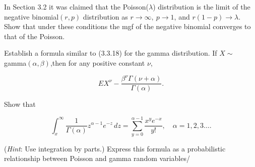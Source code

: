 \documentclass[12pt,letterpaper]{exam}
\begin{document}
\begin{questions}
	
	\begin{solution}
		
	\end{solution}
	
	\question 
	In Section 3.2 it was claimed that the Poisson(\(\lambda\)) distribution is the limit of the negative
	binomial\((r, p)\) distribution as \(r \rightarrow \infty,\ p \rightarrow 1\), and \(r(1-p) \rightarrow \lambda\).
	Show that under these
	conditions the mgf of the negative binomial converges to that of the Poisson.
	
	\begin{solution}
		
	\end{solution}
	
	\setcounter{question}{16}
	\question 
	Establish a formula similar to (3.3.18) for the gamma distribution. 
	If \(X \sim\) gamma\((\alpha,\beta)\),then for any positive constant \(\nu\),
	
	\[EX^\nu - \frac{\beta^\nu \Gamma (\nu+\alpha)}{\Gamma(\alpha)}.\]
	
	\begin{solution}
		
	\end{solution}
	
	\setcounter{question}{18}
	\question 
	Show that
	
	\[
		\int_{x}^{\infty} \frac{1}{\Gamma(\alpha)} z^{\alpha-1}e^{-z} \,dz = 
		\sum_{y=0}^{\alpha-1} \frac{x^y e^{-x}}{y!}, \quad \alpha=1,2,3\ldots.
	\]
	
	(\textit{Hint}: Use integration by parts.) Express this formula as a probabilistic relationship
	between Poisson and gamma random variables/
	

\end{questions}
\end{document}
